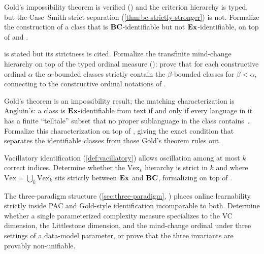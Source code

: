 \begin{openprob}
\label{op:bc-ex-formal}
Gold's impossibility theorem is verified () and the criterion hierarchy is typed, but the Case--Smith strict separation (\cref{thm:bc-strictly-stronger}) is not.  Formalize the construction of a class that is $\mathbf{BC}$-identifiable but not $\mathbf{Ex}$-identifiable, on top of  and .
\end{openprob}

\begin{openprob}
\label{op:fs-ordinal}
 is stated but its strictness is cited.  Formalize the transfinite mind-change hierarchy on top of the typed ordinal measure (): prove that for each constructive ordinal $\alpha$ the $\alpha$-bounded classes strictly contain the $\beta$-bounded classes for $\beta < \alpha$, connecting to the constructive ordinal notations of .
\end{openprob}

\begin{openprob}
\label{op:telltale}
Gold's theorem is an impossibility result; the matching characterization is Angluin's: a class is $\mathbf{Ex}$-identifiable from text if and only if every language in it has a finite ``telltale'' subset that no proper sublanguage in the class contains~\cite{Angluin1980}.  Formalize this characterization on top of , giving the exact condition that separates the identifiable classes from those Gold's theorem rules out.
\end{openprob}

\begin{openprob}
\label{op:vex-hierarchy}
Vacillatory identification (\cref{def:vacillatory}) allows oscillation among at most $k$ correct indices.  Determine whether the $\mathrm{Vex}_k$ hierarchy is strict in $k$ and where $\mathrm{Vex} = \bigcup_k \mathrm{Vex}_k$ sits strictly between $\mathbf{Ex}$ and $\mathbf{BC}$, formalizing on top of .
\end{openprob}

\begin{openprob}
\label{op:meta-measure}
The three-paradigm structure (\cref{sec:three-paradigm}, ) places online learnability strictly inside PAC and Gold-style identification incomparable to both.  Determine whether a single parameterized complexity measure specializes to the VC dimension, the Littlestone dimension, and the mind-change ordinal under three settings of a data-model parameter, or prove that the three invariants are provably non-unifiable.
\end{openprob}

